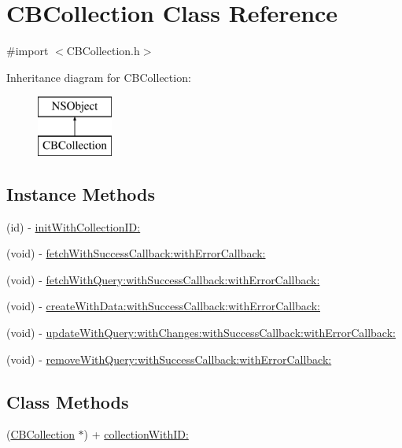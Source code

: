 \hypertarget{interface_c_b_collection}{\section{C\+B\+Collection Class Reference}
\label{interface_c_b_collection}
}


{\ttfamily \#import $<$C\+B\+Collection.\+h$>$}

Inheritance diagram for C\+B\+Collection\+:\begin{figure}[H]
\begin{center}
\leavevmode
\includegraphics[height=2.000000cm]{interface_c_b_collection}
\end{center}
\end{figure}
\subsection*{Instance Methods}
\begin{DoxyCompactItemize}
\item 
(id) -\/ \hyperlink{interface_c_b_collection_ad232890eefe5c505991479ac6f018f9a}{init\+With\+Collection\+I\+D\+:}
\item 
(void) -\/ \hyperlink{interface_c_b_collection_aebbdb37306fcfa13bcdc915c96c37297}{fetch\+With\+Success\+Callback\+:with\+Error\+Callback\+:}
\item 
(void) -\/ \hyperlink{interface_c_b_collection_ad0e9afe7d01f2bf95510b1e462d31f2d}{fetch\+With\+Query\+:with\+Success\+Callback\+:with\+Error\+Callback\+:}
\item 
(void) -\/ \hyperlink{interface_c_b_collection_a72a5135772c9829d253fb614887158b4}{create\+With\+Data\+:with\+Success\+Callback\+:with\+Error\+Callback\+:}
\item 
(void) -\/ \hyperlink{interface_c_b_collection_a381368878ef4df6b8871457e1f7e62a8}{update\+With\+Query\+:with\+Changes\+:with\+Success\+Callback\+:with\+Error\+Callback\+:}
\item 
(void) -\/ \hyperlink{interface_c_b_collection_aaf2a876d05e293b1381f491639f40c1d}{remove\+With\+Query\+:with\+Success\+Callback\+:with\+Error\+Callback\+:}
\end{DoxyCompactItemize}
\subsection*{Class Methods}
\begin{DoxyCompactItemize}
\item 
(\hyperlink{interface_c_b_collection}{C\+B\+Collection} $\ast$) + \hyperlink{interface_c_b_collection_ad0d5e667992df0fbeedc094edd29375b}{collection\+With\+I\+D\+:}
\end{DoxyCompactItemize}
